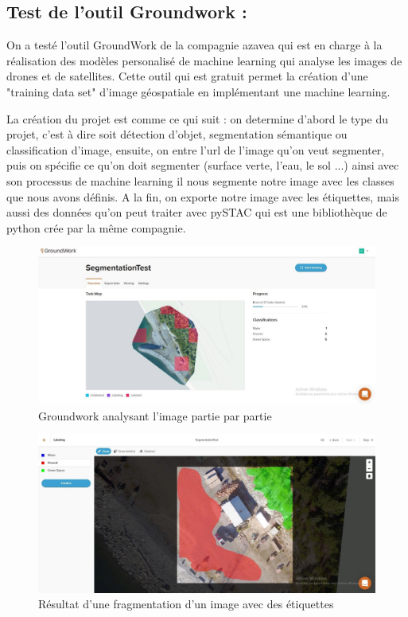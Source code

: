 \documentclass[12pt, openany]{report}
\begin{document}
\subsection{Test de l'outil Groundwork :}

On a testé l'outil GroundWork de la compagnie azavea qui est en charge à la réalisation des modèles personalisé de machine learning qui analyse les images de drones et de satellites.
Cette outil qui est gratuit permet la création d'une "training data set" d'image géospatiale en implémentant une machine learning.
\par
La création du projet est comme ce qui suit : on determine d'abord le type du projet, c'est à dire soit détection d'objet, segmentation sémantique ou classification d'image, ensuite, on entre l'url de l'image qu'on veut segmenter, puis on spécifie ce qu'on doit segmenter (surface verte, l'eau, le sol ...) ainsi avec son processus de machine learning il nous segmente notre image avec les classes que nous avons définis.
A la fin, on exporte notre image avec les étiquettes, mais aussi des données qu'on peut traiter avec pySTAC qui est une bibliothèque de python crée par la même compagnie.

\begin{figure}[H]
\centering
\includegraphics[scale=0.4]{groundwork_screen1.jpg}
\caption{Groundwork analysant l'image partie par partie}
\end{figure}

\begin{figure}[H]
\centering
\includegraphics[scale=0.4]{groundwork_screen2.jpg}
\caption{Résultat d'une fragmentation d'un image avec des étiquettes}
\end{figure}
\end{document}
